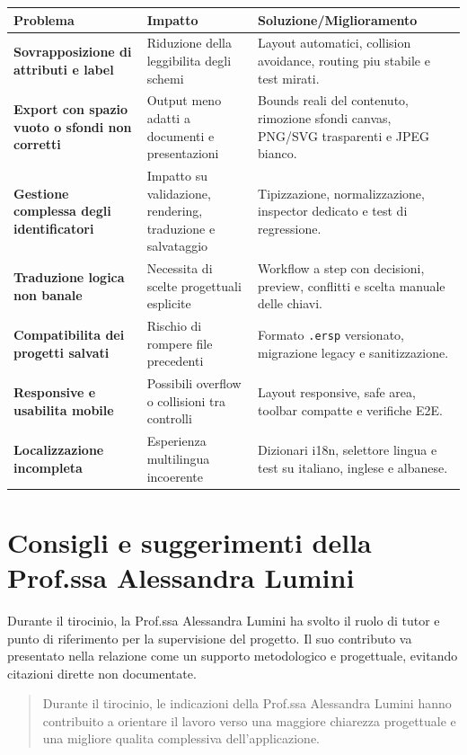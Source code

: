 \begin{tabularx}{\textwidth}{>{\bfseries}p{3.6cm}p{4.1cm}X}
Problema & Impatto & Soluzione/Miglioramento \\
\hline
Sovrapposizione di attributi e label & Riduzione della leggibilita degli schemi & Layout automatici, collision avoidance, routing piu stabile e test mirati. \\
Export con spazio vuoto o sfondi non corretti & Output meno adatti a documenti e presentazioni & Bounds reali del contenuto, rimozione sfondi canvas, PNG/SVG trasparenti e JPEG bianco. \\
Gestione complessa degli identificatori & Impatto su validazione, rendering, traduzione e salvataggio & Tipizzazione, normalizzazione, inspector dedicato e test di regressione. \\
Traduzione logica non banale & Necessita di scelte progettuali esplicite & Workflow a step con decisioni, preview, conflitti e scelta manuale delle chiavi. \\
Compatibilita dei progetti salvati & Rischio di rompere file precedenti & Formato \texttt{.ersp} versionato, migrazione legacy e sanitizzazione. \\
Responsive e usabilita mobile & Possibili overflow o collisioni tra controlli & Layout responsive, safe area, toolbar compatte e verifiche E2E. \\
Localizzazione incompleta & Esperienza multilingua incoerente & Dizionari i18n, selettore lingua e test su italiano, inglese e albanese. \\
\end{tabularx}

\section{Consigli e suggerimenti della Prof.ssa Alessandra Lumini}

Durante il tirocinio, la Prof.ssa Alessandra Lumini ha svolto il ruolo di tutor e punto di riferimento per la supervisione del progetto. Il suo contributo va presentato nella relazione come un supporto metodologico e progettuale, evitando citazioni dirette non documentate.

\begin{quote}
Durante il tirocinio, le indicazioni della Prof.ssa Alessandra Lumini hanno contribuito a orientare il lavoro verso una maggiore chiarezza progettuale e una migliore qualita complessiva dell'applicazione.
\end{quote}


